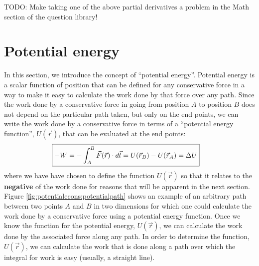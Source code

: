 TODO: Make taking one of the above partial derivatives a problem in the Math section of the question library!

\section{Potential energy}
In this section, we introduce the concept of ``potential energy''. Potential energy is a scalar function of position that can be defined for any conservative force in a way to make it easy to calculate the work done by that force over any path. Since the work done by a conservative force in going from position $A$ to position $B$ does not depend on the particular path taken, but only on the end points, we can write the work done by a conservative force in terms of a ``potential energy function'', $U(\vec r)$, that can be evaluated at the end points:
\begin{align}
\Aboxed{-W = - \int_A^B \vec F(\vec r) \cdot d\vec l = U(\vec r_B) - U(\vec r_A) = \Delta U}
\end{align}
where we have have chosen to define the function $U(\vec r)$ so that it relates to the \textbf{negative} of the work done for reasons that will be apparent in the next section. Figure \ref{fig:potentialecons:potentialpath} shows an example of an arbitrary path between two points $A$ and $B$ in two dimensions for which one could calculate the work done by a conservative force using a potential energy function.
Once we know the function for the potential energy, $U(\vec r)$, we can calculate the work done by the associated force along any path. In order to determine the function, $U(\vec r)$, we can calculate the work that is done along a path over which the integral for work is easy (usually, a straight line). 

